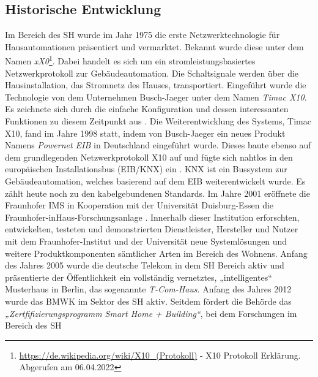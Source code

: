     \subsection{Historische Entwicklung}
    \label{subsec:entwicklung_sh}
        Im Bereich des \acl{SH} wurde im Jahr 1975 die erste Netzwerktechnologie für Hausautomationen 
        präsentiert und vermarktet. Bekannt wurde diese unter dem Namen \textit{xX0}\footnote{\url{https://de.wikipedia.org/wiki/X10_(Protokoll)} - X10 Protokoll Erklärung. Abgerufen am 06.04.2022}. 
        Dabei handelt es sich um ein stromleistungsbasiertes Netzwerkprotokoll zur Gebäudeautomation. Die 
        Schaltsignale werden über die Hausinstallation, das Stromnetz des Hauses, transportiert. Eingeführt wurde die 
        Technologie von dem Unternehmen Busch-Jaeger unter dem Namen \textit{Timac X10}. Es zeichnete sich durch die 
        einfache Konfiguration und dessen interessanten Funktionen zu diesem Zeitpunkt aus \cite{aschendorf2014energiemanagement}. %
        Die Weiterentwicklung des Systems, Timac X10, fand im Jahre 1998 statt, indem von Busch-Jaeger ein neues 
        Produkt Namens \textit{Powernet EIB} in Deutschland eingeführt wurde. Dieses baute ebenso auf dem grundlegenden 
        Netzwerkprotokoll X10 auf und fügte sich nahtlos in den europäischen Installationsbus (EIB/KNX) ein \cite{busch-jaeger}. 
        KNX ist ein Bussystem zur Gebäudeautomation, welches basierend auf dem EIB weiterentwickelt wurde. Es 
        zählt heute noch zu den kabelgebundenen Standards. Im Jahre 2001 eröffnete die Fraunhofer IMS in Kooperation 
        mit der Universität Duisburg-Essen die Fraunhofer-inHaus-Forschungsanlage \cite{fraunhofer-forschungsanlage}. 
        Innerhalb dieser Institution erforschten, entwickelten, testeten und demonstrierten Dienstleister, Hersteller und Nutzer 
        mit dem Fraunhofer-Institut und der Universität neue Systemlösungen und weitere Produktkomponenten sämtlicher Arten 
        im Bereich des Wohnens. Anfang des Jahres 2005 wurde die deutsche Telekom in dem \acl{SH} Bereich aktiv und 
        präsentierte der Öffentlichkeit ein vollständig vernetztes, „intelligentes“ Musterhaus in Berlin, das sogenannte 
        \textit{T-Com-Haus}. Anfang des Jahres 2012 wurde das \ac{BMWK} im Sektor des \acl{SH} aktiv. Seitdem fördert die 
        Behörde das \textit{„Zertfifizierungsprogramm Smart Home + Building“}, bei dem Forschungen im Bereich des \acl{SH} 
